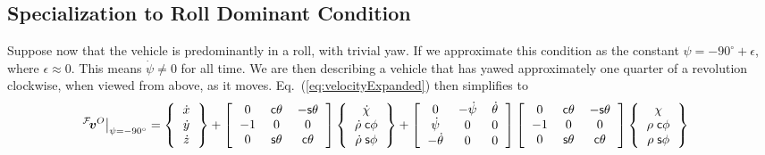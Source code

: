 \documentclass[10pt,legalpaper,twocolumn,reqno]{amsart}
\begin{document}
\subsection{Specialization to Roll Dominant Condition}
Suppose now that the vehicle is predominantly in a roll, with trivial yaw.
If we approximate this condition as the constant $\psi = -90^{\circ} + \epsilon$, 
where $\epsilon \approx 0$.
This means  $\dot{\psi} \neq 0$ for all time.  We are then describing 
a vehicle that has yawed approximately one quarter of a revolution clockwise, 
when viewed from above, as it moves.
Eq.~(\ref{eq:velocityExpanded}) then simplifies to 
\begin{eqnarray}
\left.\hframe{F}\vv^{O}\right|_{\psi=-90^{\circ}}
&= 
\left\{  
	\begin{tabular}{c}
 	  	$\dot{x}$ \\ 
 		$\dot{y}$ \\ 
 		$\dot{z}$
 	\end{tabular}
\right\}
+
\left[
  \begin{tabular}{ccc}
  $0$  	& $\hcos \theta$ & $-\hsin \theta$ \\ 
  $-1$   & $0$ & $0$ \\
  $0$   & $ \hsin \theta$ & $\hcos \theta$  
  \end{tabular}
\right]
\left\{  
	\begin{tabular}{c}
 	  	$\dot{\chi}$ \\ 
 		$\dot{\rho} \; \hcos \phi$ \\ 
 		$\dot{\rho} \; \hsin \phi$
 	\end{tabular}
\right\}
+
\left[
  \begin{tabular}{ccc}
  $0$  & $-\dot{\psi}$ & $\dot{\theta}$ \\ 
  $\dot{\psi}$   & $0$ & $0$ \\
  $-\dot{\theta}$  & $0$ & $0$  
  \end{tabular}
\right]
\left[
  \begin{tabular}{ccc}
  $0$  	& $\hcos \theta$ & $-\hsin \theta$ \\ 
  $-1$   & $0$ & $0$ \\
  $0$   & $ \hsin \theta$ & $\hcos \theta$  
  \end{tabular}
\right]
\left\{  
	\begin{tabular}{c}
 	  	$\chi$ \\ 
 		$\rho \; \hcos \phi$ \\ 
 		$\rho \; \hsin \phi$
 	\end{tabular}
\right\}

\end{eqnarray}
\end{document}
